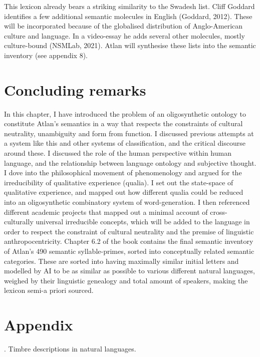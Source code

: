 This lexicon already bears a striking similarity to the Swadesh list. Cliff Goddard identifies a few additional semantic molecules in English (Goddard, 2012). These will be incorporated because of the globalised distribution of Anglo-American culture and language. In a video-essay he adds several other molecules, mostly culture-bound (NSMLab, 2021). Atlan will synthesise these lists into the semantic inventory (see appendix 8).  

 

\section{Concluding remarks}

In this chapter, I have introduced the problem of an oligosynthetic ontology to constitute Atlan’s semantics in a way that respects the constraints of cultural neutrality, unambiguity and form from function. I discussed previous attempts at a system like this and other systems of classification, and the critical discourse around these. I discussed the role of the human perspective within human language, and the relationship between language ontology and subjective thought. I dove into the philosophical movement of phenomenology and argued for the irreducibility of qualitative experience (qualia). I set out the state-space of qualitative experience, and mapped out how different qualia could be reduced into an oligosynthetic combinatory system of word-generation. I then referenced different academic projects that mapped out a minimal account of cross-culturally universal irreducible concepts, which will be added to the language in order to respect the constraint of cultural neutrality and the premise of linguistic anthropocentricity. Chapter 6.2 of the book contains the final semantic inventory of Atlan’s 490 semantic syllable-primes, sorted into conceptually related semantic categories. These are sorted into having maximally similar initial letters and modelled by AI to be as similar as possible to various different natural languages, weighed by their linguistic genealogy and total amount of speakers, making the lexicon semi-a priori sourced. 


\section{Appendix}
. Timbre descriptions in natural languages.

